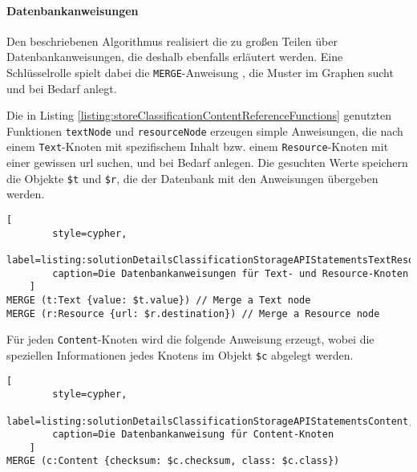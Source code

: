     \paragraph{Datenbankanweisungen}
    Den beschriebenen Algorithmus realisiert die {\classificationStorageAPI}
    zu großen Teilen über Datenbankanweisungen,
    die deshalb ebenfalls erläutert werden.
    Eine Schlüsselrolle spielt dabei die \texttt{MERGE}-Anweisung \cite[Kapitel 3.3.16]{neo4j:documentation},
    die Muster im Graphen sucht und bei Bedarf anlegt.

    Die in Listing \ref{listing:storeClassificationContentReferenceFunctions} genutzten
    Funktionen \texttt{textNode} und \texttt{resourceNode} erzeugen simple Anweisungen,
    die nach einem \texttt{Text}-Knoten mit spezifischem Inhalt bzw.
    einem \texttt{Resource}-Knoten mit einer gewissen \gls{url} suchen,
    und bei Bedarf anlegen.
    Die gesuchten Werte speichern die Objekte \verb+$t+ und \verb+$r+,
    die der Datenbank mit den Anweisungen übergeben werden.

    \begin{lstlisting}[
        style=cypher,
        label=listing:solutionDetailsClassificationStorageAPIStatementsTextResource,
        caption=Die Datenbankanweisungen für Text- und Resource-Knoten
    ]
MERGE (t:Text {value: $t.value}) // Merge a Text node
MERGE (r:Resource {url: $r.destination}) // Merge a Resource node
    \end{lstlisting}

    Für jeden \texttt{Content}-Knoten wird die folgende Anweisung erzeugt,
    wobei die speziellen Informationen jedes Knotens im Objekt \verb+$c+
    abgelegt werden.

    \begin{lstlisting}[
        style=cypher,
        label=listing:solutionDetailsClassificationStorageAPIStatementsContent,
        caption=Die Datenbankanweisung für Content-Knoten
    ]
MERGE (c:Content {checksum: $c.checksum, class: $c.class})
    \end{lstlisting}

